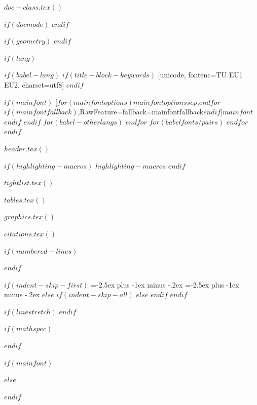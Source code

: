 $doc-class.tex()$
\usepackage{amsmath}
\usepackage{amssymb}

\usepackage[globalsuspend=true]{assoccnt}

$if(docmode)$
\geometry{inner=1in, outer=1in}
\fancyhfoffset[LE,RO]{0cm}
$endif$

$if(geometry)$
\geometry{$for(geometry)$$geometry$$sep$,$endfor$}
\fancyhfoffset[LE,RO]{0cm}
$endif$

$if(lang)$
\usepackage[bidi=default]{babel}
$if(babel-lang)$
$if(title-block-keywords)$
 [unicode, fontenc=TU EU1 EU2, charset=utf8] 
\EndBabelCommands
$endif$


$if(mainfont)$
[$for(mainfontoptions)$$mainfontoptions$$sep$,$endfor$$if(mainfontfallback)$,RawFeature={fallback=mainfontfallback}$endif$]{$mainfont$}
$endif$
$endif$
$for(babel-otherlangs)$
$endfor$
$for(babelfonts/pairs)$
$endfor$
\let\LanguageShortHands\languageshorthands
\def\languageshorthands#1{}
$endif$

\RequirePackage{longtable}
\RequirePackage{threeparttablex}

$header.tex()$

$if(highlighting-macros)$
$highlighting-macros$
$endif$

$tightlist.tex()$

$tables.tex()$

$graphics.tex()$


$citations.tex()$


$if(numbered-lines)$
\usepackage[nolongtablepatch]{lineno}
\linenumbers
$endif$

$if(indent-skip-first)$
\makeatletter
\b@level@one@skip=-2.5ex plus -1ex minus -.2ex
\b@level@two@skip=-2.5ex plus -1ex minus -.2ex
\makeatother
\setlength\parindent{1cm}
\setlength\parskip{0cm}
$else$
$if(indent-skip-all)$
\setlength\parindent{0cm}
\setlength\parskip{0cm}
$else$
\setlength\parindent{1cm}
\setlength\parskip{0cm}
$endif$
$endif$


$if(linestretch)$
$endif$

$if(mathspec)$
\usepackage{mathspec}
$endif$

$if(mainfont)$
\usepackage{fontspec} 
$else$
\usepackage{newtx}
$endif$

